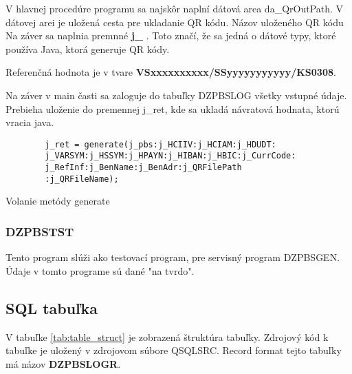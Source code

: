 V hlavnej procedúre programu sa najskôr naplní dátová area da\_QrOutPath. V dátovej arei je uložená cesta pre ukladanie QR kódu. Názov uloženého QR kódu  Na záver sa naplnia premnné \textbf{j\_} . Toto značí, že sa jedná o dátové typy, ktoré používa Java, ktorá generuje QR kódy.

Referenčná hodnota je v tvare \textbf{VSxxxxxxxxxx/SSyyyyyyyyyyy/KS0308}.

Na záver v main časti sa zaloguje do tabuľky DZPBSLOG všetky vstupné údaje. Prebieha uloženie do premennej j\_ret, kde sa ukladá návratová hodnata, ktorú vracia java. 

\begin{listing}[!ht]
\label{exmpl:generate}
\begin{center}
    \begin{verbatim}
        j_ret = generate(j_pbs:j_HCIIV:j_HCIAM:j_HDUDT:
        j_VARSYM:j_HSSYM:j_HPAYN:j_HIBAN:j_HBIC:j_CurrCode:                       
        j_RefInf:j_BenName:j_BenAdr:j_QRFilePath                 
        :j_QRFileName);                                          
    \end{verbatim}
    \caption{Volanie metódy generate}
\end{center}
\end{listing}
\subsubsection{DZPBSTST}

Tento program slúži ako testovací program, pre servisný program DZPBSGEN. Údaje v tomto programe sú dané "na tvrdo". 

\subsection{\acs{SQL} tabuľka}

V tabuľke \ref{tab:table_struct} je zobrazená štruktúra tabuľky. Zdrojový kód k tabuľke je uložený v zdrojovom súbore QSQLSRC.  Record format tejto tabuľky má názov \textbf{DZPBSLOGR}. 

